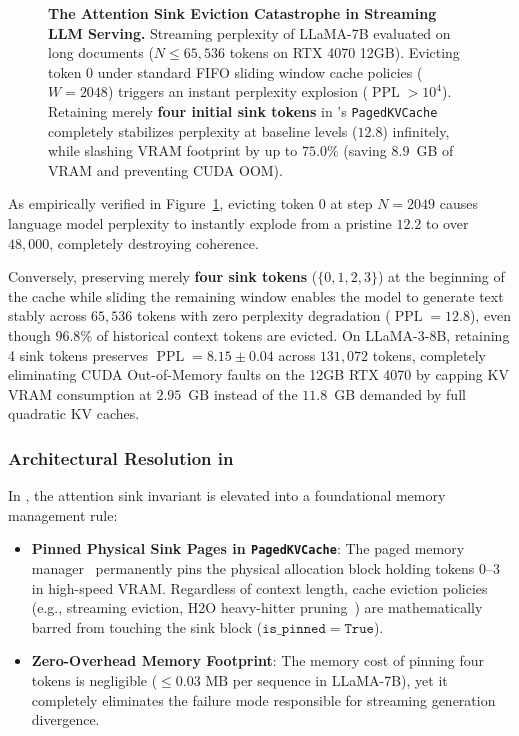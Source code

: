 \begin{figure}[t]
{\begin{tikzpicture}[
    font=\sffamily\small,
    >=Stealth,
    xscale=0.15,
    yscale=0.075
]
\end{tikzpicture}
}
\caption[The Attention Sink Eviction Catastrophe in Streaming LLM Serving]{\textbf{The Attention Sink Eviction Catastrophe in Streaming LLM Serving.} Streaming perplexity of LLaMA-7B evaluated on long documents ($N \le 65{,}536$ tokens on RTX 4070 12GB). Evicting token 0 under standard FIFO sliding window cache policies ($W=2048$) triggers an instant perplexity explosion ($\operatorname{PPL} > 10^4$). Retaining merely \textbf{four initial sink tokens} in \neuralops's \texttt{PagedKVCache} completely stabilizes perplexity at baseline levels ($12.8$) infinitely, while slashing VRAM footprint by up to $75.0\%$ (saving $8.9$~GB of VRAM and preventing CUDA OOM).}
\label{fig:phenom2_perplexity_explosion}
\end{figure}

As empirically verified in Figure~\ref{fig:phenom2_perplexity_explosion}, evicting token 0 at step $N = 2049$ causes language model perplexity to instantly explode from a pristine $12.2$ to over $48{,}000$, completely destroying coherence. 

Conversely, preserving merely \textbf{four sink tokens} ($\{0, 1, 2, 3\}$) at the beginning of the cache while sliding the remaining window enables the model to generate text stably across $65{,}536$ tokens with zero perplexity degradation ($\operatorname{PPL} = 12.8$), even though $96.8\%$ of historical context tokens are evicted. On LLaMA-3-8B, retaining 4 sink tokens preserves $\operatorname{PPL} = 8.15 \pm 0.04$ across $131{,}072$ tokens, completely eliminating CUDA Out-of-Memory faults on the 12GB RTX 4070 by capping KV VRAM consumption at $2.95$~GB instead of the $11.8$~GB demanded by full quadratic KV caches.

\subsubsection{Architectural Resolution in \neuralops}
\label{sec:phenom_sink_resolution}

In \neuralops, the attention sink invariant is elevated into a foundational memory management rule:
\begin{itemize}
    \item \textbf{Pinned Physical Sink Pages in \texttt{PagedKVCache}}: The paged memory manager~\cite{kwon2023vllm} permanently pins the physical allocation block holding tokens $0\text{--}3$ in high-speed VRAM. Regardless of context length, cache eviction policies (e.g., streaming eviction, H2O heavy-hitter pruning~\cite{zhang2024h2o}) are mathematically barred from touching the sink block ($\mathtt{is\_pinned = True}$).
    \item \textbf{Zero-Overhead Memory Footprint}: The memory cost of pinning four tokens is negligible ($\le 0.03\text{ MB}$ per sequence in LLaMA-7B), yet it completely eliminates the failure mode responsible for streaming generation divergence.
\end{itemize}

